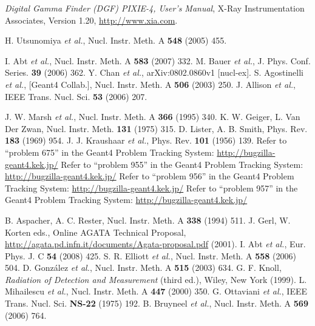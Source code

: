 \begin{thebibliography}{99}
\textit{Digital Gamma Finder (DGF) PIXIE-4, User's Manual}, X-Ray Instrumentation Associates, Version 1.20, \url{http://www.xia.com}.%

H. Utsunomiya \textit{et al.}, Nucl. Instr. Meth. A \textbf{548} (2005) 455.

I. Abt \textit{et al.}, Nucl. Instr. Meth. A \textbf{583} (2007) 332.
M. Bauer \textit{et al.}, J. Phys. Conf. Series. \textbf{39} (2006) 362.
Y. Chan \textit{et al.}, arXiv:0802.0860v1 [nucl-ex].
S. Agostinelli \textit{et al.}, [Geant4 Collab.], Nucl. Instr. Meth. A \textbf{506} (2003) 250.
J. Allison \textit{et al.}, IEEE Trans. Nucl. Sci. \textbf{53} (2006) 207.

J. W. Marsh \textit{et al.}, Nucl. Instr. Meth. A \textbf{366} (1995) 340.
K. W. Geiger, L. Van Der Zwan, Nucl. Instr. Meth. \textbf{131} (1975) 315.
D. Lister, A. B. Smith, Phys. Rev. \textbf{183} (1969)   954.
J. J. Kraushaar \textit{et al.}, Phys. Rev. \textbf{101} (1956) 139.
Refer to ``problem 675'' in the Geant4 Problem Tracking System: \url{http://bugzilla-geant4.kek.jp/}
Refer to ``problem 955'' in the Geant4 Problem Tracking System: \url{http://bugzilla-geant4.kek.jp/}
Refer to ``problem 956'' in the Geant4 Problem Tracking System: \url{http://bugzilla-geant4.kek.jp/}
Refer to ``problem 957'' in the Geant4 Problem Tracking System: \url{http://bugzilla-geant4.kek.jp/}

B. Aspacher, A. C. Rester, Nucl. Instr. Meth. A \textbf{338} (1994) 511.
J. Gerl, W. Korten eds., Online AGATA Technical Proposal, \url{http://agata.pd.infn.it/documents/Agata-proposal.pdf} (2001).
I. Abt \textit{et al.}, Eur. Phys. J. C \textbf{54} (2008) 425.
S. R. Elliott \textit{et al.}, Nucl. Instr. Meth. A \textbf{558} (2006) 504.
D. Gonz\'alez \textit{et al.}, Nucl. Instr. Meth. A \textbf{515} (2003) 634.
G. F. Knoll, \textit{Radiation of Detection and Measurement} (third ed.), Wiley, New York (1999).
L. Mihailescu \textit{et al.}, Nucl. Instr. Meth. A \textbf{447} (2000) 350.
G. Ottaviani \textit{et al.}, IEEE Trans. Nucl. Sci. \textbf{NS-22} (1975) 192.
B. Bruyneel \textit{et al.}, Nucl. Instr. Meth. A \textbf{569} (2006) 764.%

\end{thebibliography}



